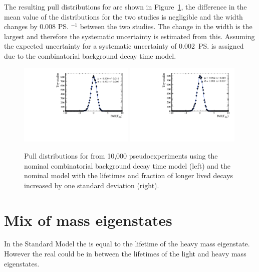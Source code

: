 The resulting pull distributions for \Gmumu are shown in Figure~\ref{fig:CBGextreme}, the difference in the mean value of the distributions for the two studies is negligible and the width changes by 0.008 \ps$^{-1}$ between the two studies. The change in the width is the largest and therefore the systematic uncertainty is estimated from this. Assuming the expected uncertainty for \tmumu a systematic uncertainty of 0.002~\ps is assigned due to the combinatorial background decay time model.

\begin{figure}[htbp]
  \centering
    \includegraphics[width=0.49\textwidth]{./Figs/LifetimeSystematics/Gamma_pull_mass_pdf_Run1.pdf}
    \includegraphics[width=0.49\textwidth]{./Figs/LifetimeSystematics/Bs2MuMu_gamma_pull_CKM_extremeCBG_DT.pdf}
  \caption{Pull distributions for \Gmumu from 10,000 pseudoexperiments using the nominal combinatorial background decay time model (left) and the nominal model with the lifetimes and fraction of longer lived decays increased by one standard deviation (right).}
  \label{fig:CBGextreme}
\end{figure}


\section{Mix of \bs mass eigenstates}
\label{sec:mixofeigenstates}

In the Standard Model the \bsmumu \el is equal to the lifetime of the heavy \bs mass eigenstate. However the real \bsmumu \el could be in between the lifetimes of the light and heavy mass eigenstates. %


